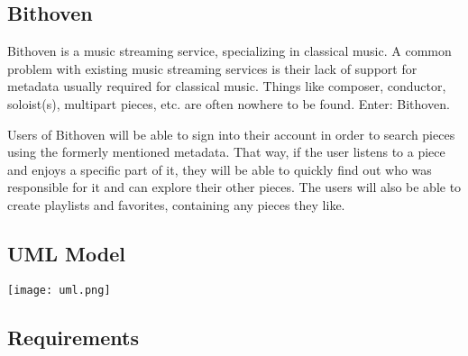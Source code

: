 
\subsection{Bithoven}
\label{project-description-bithoven}
Bithoven is a music streaming service, specializing in classical music. A common
problem with existing music streaming services is their lack of support for
metadata usually required for classical music. Things like composer, conductor,
soloist(s), multipart pieces, etc. are often nowhere to be found. Enter:
Bithoven.

Users of Bithoven will be able to sign into their account in order to search
pieces using the formerly mentioned metadata. That way, if the user listens to
a piece and enjoys a specific part of it, they will be able to quickly find out
who was responsible for it and can explore their other pieces. The users will
also be able to create playlists and favorites, containing any pieces they like.

\subsection{UML Model}
\label{project-description-uml}
\texttt{[image: uml.png]}

\subsection{Requirements}
\label{project-description-req}

